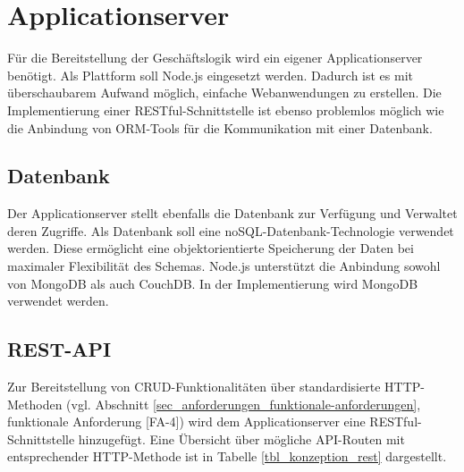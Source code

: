 \newpage
\section{Applicationserver}
\label{sec_konzeption_applicationserver}

Für die Bereitstellung der Geschäftslogik wird ein eigener Applicationserver benötigt. Als Plattform soll Node.js eingesetzt werden. Dadurch ist es mit überschaubarem Aufwand möglich, einfache Webanwendungen zu erstellen. Die Implementierung einer RESTful-Schnittstelle ist ebenso problemlos möglich wie die Anbindung von ORM-Tools für die Kommunikation mit einer Datenbank. 

\subsection{Datenbank}

Der Applicationserver stellt ebenfalls die Datenbank zur Verfügung und Verwaltet deren Zugriffe. Als Datenbank soll eine noSQL-Datenbank-Technologie verwendet werden. Diese ermöglicht eine objektorientierte Speicherung der Daten bei maximaler Flexibilität des Schemas. Node.js unterstützt die Anbindung sowohl von MongoDB als auch CouchDB. In der Implementierung wird MongoDB verwendet werden.

\subsection{REST-API}
\label{subsec_konzeption_rest-api}

Zur Bereitstellung von CRUD-Funktionalitäten über standardisierte HTTP-Methoden (vgl. Abschnitt \ref{sec_anforderungen_funktionale-anforderungen}, funktionale Anforderung [FA-4]) wird dem Applicationserver eine RESTful-Schnittstelle hinzugefügt. Eine Übersicht über mögliche API-Routen mit entsprechender HTTP-Methode ist in Tabelle \ref{tbl_konzeption_rest} dargestellt. 

